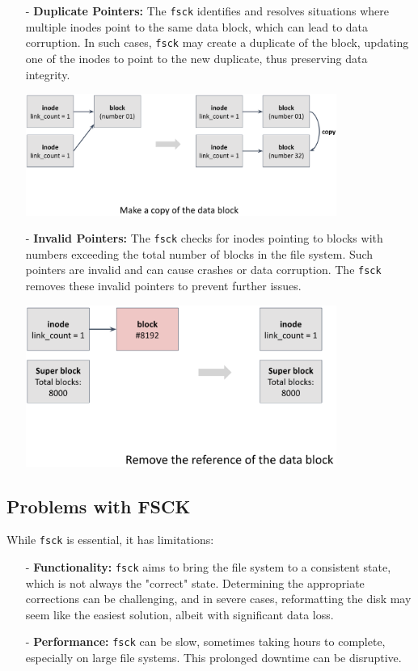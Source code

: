 \documentclass[../../compsys.tex]{subfiles}
\begin{document}
\begin{itemize}
    \item [-] \textbf{Duplicate Pointers:}
    The \texttt{fsck} identifies and resolves situations where multiple inodes point to the same data block, which can lead to data corruption. In such cases, \texttt{fsck} may create a duplicate of the block, updating one of the inodes to point to the new duplicate, thus preserving data integrity.
    \begin{center}
        \includegraphics[width=0.8\textwidth]{chapters/L7/images/fsck-dupp.png}
    \end{center}
\newpage
    \item [-] \textbf{Invalid Pointers:}
    The \texttt{fsck} checks for inodes pointing to blocks with numbers exceeding the total number of blocks in the file system. Such pointers are invalid and can cause crashes or data corruption. The \texttt{fsck} removes these invalid pointers to prevent further issues.
    \begin{center}
        \includegraphics[width=0.8\textwidth]{chapters/L7/images/fsck-bad.png}
    \end{center}
\end{itemize}

\subsection{Problems with FSCK}

While \texttt{fsck} is essential, it has limitations:

\begin{itemize}
    \item [-] \textbf{Functionality:}
    \texttt{fsck} aims to bring the file system to a consistent state, which is not always the "correct" state. Determining the appropriate corrections can be challenging, and in severe cases, reformatting the disk may seem like the easiest solution, albeit with significant data loss.

    \item [-] \textbf{Performance:}
    \texttt{fsck} can be slow, sometimes taking hours to complete, especially on large file systems. This prolonged downtime can be disruptive.
\end{itemize}
\end{document}
